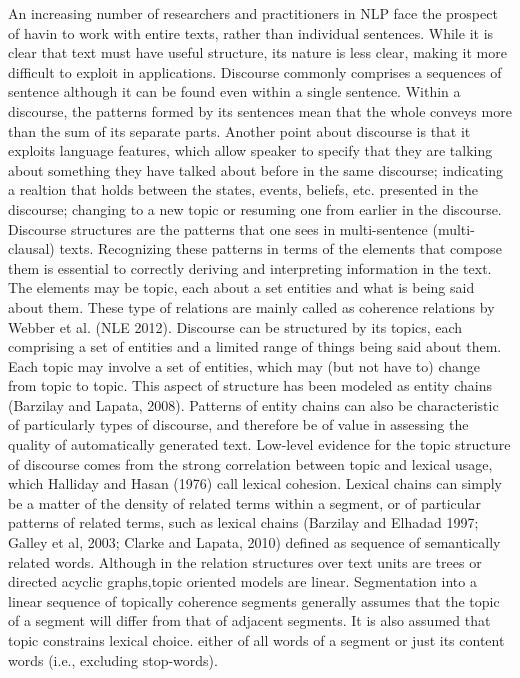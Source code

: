 An increasing number of researchers and practitioners in NLP face the prospect of havin to work with entire texts, rather than individual sentences. 
While it is clear that text must have useful structure, its nature is less clear, making it more difficult to exploit in applications. 
Discourse commonly comprises a sequences of sentence although it can be found even within a single sentence. 
Within a discourse, the patterns formed by its sentences mean that the whole conveys more than the sum of its separate parts. 
Another point  about discourse is that it exploits language  features, which allow speaker to specify that they are talking about something they have talked about before in the same discourse; indicating a realtion that holds between the states, events, beliefs, etc.  presented in the discourse; changing to a new topic or resuming one from earlier in the discourse.
Discourse structures are the patterns that one sees in multi-sentence (multi-clausal) texts. 
Recognizing these patterns in terms of the elements that compose them is essential to correctly deriving and interpreting information in the text. 
The elements may be topic, each  about a set entities and what is being said about them.
These type of relations are mainly called as coherence relations by Webber et al. (NLE 2012). 
Discourse can be structured by its topics, each comprising a set of entities and a limited range of things being said about them. 
Each topic may involve a set of entities, which may (but not have to) change from topic to topic. 
This aspect of structure has been modeled as entity chains (Barzilay and Lapata, 2008).
Patterns of entity chains can also be characteristic of particularly types of discourse, and therefore be of value in assessing the quality of automatically generated text. 
Low-level evidence for the topic structure of discourse comes from the strong correlation between topic and lexical usage, which Halliday and Hasan (1976) call lexical cohesion. 
Lexical chains can simply be a matter of the density of related terms within a segment, or of particular patterns of related terms, such as lexical chains (Barzilay and Elhadad 1997; Galley et al, 2003; Clarke and Lapata, 2010) defined as sequence of semantically related words. 
Although in the relation structures over text units are trees or directed acyclic graphs,topic oriented models are linear. 
Segmentation into a linear sequence of topically coherence segments generally assumes that the topic of a segment will differ from that of adjacent segments. It is also assumed that topic constrains lexical choice. either of all words of a segment or just its content words (i.e., excluding stop-words).

